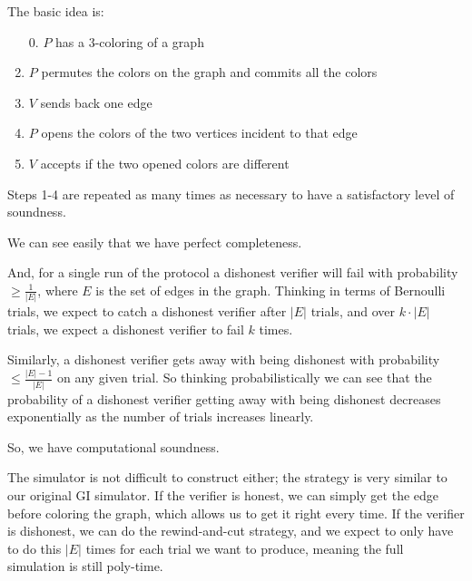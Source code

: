 \documentclass[11pt]{article}
\begin{document}
The basic idea is:
\begin{enumerate}
\item [0.] \(P\) has a 3-coloring of a graph
\item \(P\) permutes the colors on the graph and commits all the colors
\item \(V\) sends back one edge
\item \(P\) opens the colors of the two vertices incident to that edge
\item \(V\) accepts if the two opened colors are different
\end{enumerate}
Steps 1-4 are repeated as many times as necessary to have a satisfactory level of soundness.

\newpage
We can see easily that we have perfect completeness.\smallskip

And, for a single run of the protocol a dishonest verifier will fail with probability \(\ge\frac{1}{|E|}\), where \(E\) is the set of edges in the graph. Thinking in terms of Bernoulli trials, we expect to catch a dishonest verifier after \(|E|\) trials, and over \(k\cdot|E|\) trials, we expect a dishonest verifier to fail \(k\) times. \smallskip

Similarly, a dishonest verifier gets away with being dishonest with probability \(\le\frac{|E|-1}{|E|}\) on any given trial. So thinking probabilistically we can see that the probability of a dishonest verifier getting away with being dishonest decreases exponentially as the number of trials increases linearly.\smallskip

So, we have computational soundness.\medskip

The simulator is not difficult to construct either; the strategy is very similar to our original GI simulator. If the verifier is honest, we can simply get the edge before coloring the graph, which allows us to get it right every time. If the verifier is dishonest, we can do the rewind-and-cut strategy, and we expect to only have to do this \(|E|\) times for each trial we want to produce, meaning the full simulation is still poly-time.
\end{document}
